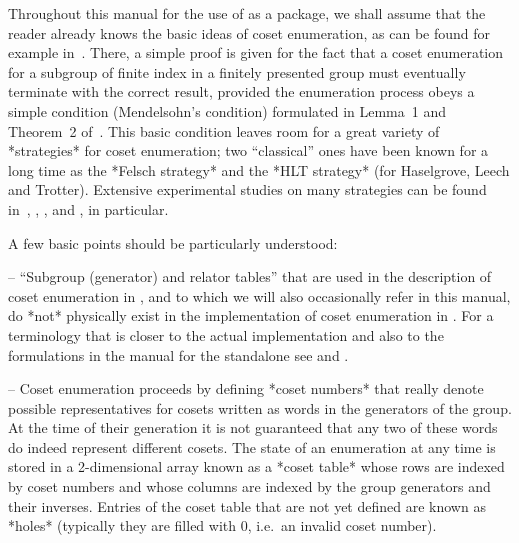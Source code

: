 

Throughout this manual for the use of {\ACE} as a {\GAP}  package,  we
shall assume that the reader already knows the basic  ideas  of  coset
enumeration, as can be found for  example  in~\cite{Neu82}.  There,  a
simple proof is given for the fact that  a  coset  enumeration  for  a
subgroup of finite index in a finitely presented group must eventually
terminate with the correct result, provided  the  enumeration  process
obeys  a  simple  condition  (Mendelsohn's  condition)  formulated  in
Lemma~1 and Theorem~2 of~\cite{Neu82}.  This  basic  condition  leaves
room for a great variety of *strategies* for  coset  enumeration;  two
``classical'' ones have been known for a  long  time  as  the  *Felsch
strategy* and the *HLT strategy* (for Haselgrove, Leech and  Trotter).
Extensive  experimental  studies  on  many  strategies  can  be  found
in~\cite{CDHW73},  \cite{Hav91},  \cite{HR99ace},  and  \cite{HR01},  in
particular.

A few basic points should be particularly understood:

\beginlist%

\item{--} ``Subgroup (generator) and relator tables'' that are used in
the description of coset enumeration in \cite{Neu82}, and to which  we
will also occasionally refer in this manual, do *not* physically exist
in  the  implementation  of  coset  enumeration  in  {\ACE}.   For   a
terminology that is closer to the actual implementation  and  also  to
the  formulations  in  the  manual  for  the  {\ACE}  standalone   see
\cite{CDHW73} and \cite{Hav91}.

\item{--} Coset enumeration proceeds by defining *coset numbers*  that
really denote possible representatives for cosets written as words  in
the generators of the group. At the time of their generation it is not
guaranteed that any two of these words do indeed  represent  different
cosets. The state of an  enumeration  at  any  time  is  stored  in  a
2-dimensional array known as a *coset table* whose rows are indexed by
coset numbers and whose columns are indexed by  the  group  generators
and their inverses. Entries of  the  coset  table  that  are  not  yet
defined are known as  *holes*  (typically  they  are  filled  with  0,
i.e.~an invalid coset number).

